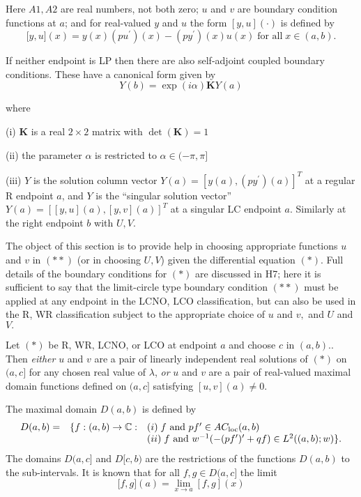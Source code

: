 \documentclass[12pt]{amsart}%
\theoremstyle{plain}
\numberwithin{equation}{section}
\numberwithin{theorem}{section}
\begin{document}
Here $A1,A2$ are real numbers, not both zero; $u$ and $v$ are boundary
condition functions at $a$; and for real-valued $y$ and $u$ the form
$[y,u](\cdot)$ is defined by%
\[
\lbrack y,u](x)=y(x)(pu^{\prime})(x)-(py^{\prime})(x)u(x)\;\text{for
all}\;x\in(a,b).
\]

If neither endpoint is LP then there are also self-adjoint coupled boundary
conditions. These have a canonical form given by%
\[
Y(b)=\exp(i\alpha)\mathbf{K}Y(a)
\]

\noindent where

(i) $\mathbf{K}$ is a real $2\times2$ matrix with $\det(\mathbf{K})=1$

(ii) the parameter $\alpha$ is restricted to $\alpha\in(-\pi,\pi]$

(iii) $Y$ is the solution column vector $Y(a)=[y(a),(py^{\prime})(a)]^{T}$ at
a regular R endpoint $a$, and $Y$ is the ``singular solution vector''
$Y(a)=[[y,u](a),[y,v](a)]^{T}$ at a singular LC endpoint $a$. Similarly at the
right endpoint $b$ with $U,V.$

The object of this section is to provide help in choosing appropriate
functions $u$ and $v$ in $(\ast\ast)$ (or in choosing $U,V$) given the
differential equation $(\ast)$. Full details of the boundary conditions for
$(\ast)$ are discussed in H7; here it is sufficient to say that the
limit-circle type boundary condition $(\ast\ast)$ must be applied at any
endpoint in the LCNO, LCO classification, but can also be used in the R, WR
classification subject to the appropriate choice of $u$ and $v,$ and $U$ and $V.$

Let $(\ast)$ be R, WR, LCNO, or LCO at endpoint $a$ and choose $c$ in
$(a,b).$. Then \textit{either} $u$ and $v$ are a pair of linearly independent
real solutions of $(\ast)$ on $(a,c]$ for any chosen real value of $\lambda$,
\textit{or }$u$ and $v$ are a pair of real-valued maximal domain functions
defined on $(a,c]$ satisfying $[u,v](a)\neq0.$

The maximal domain $D(a,b)$ is defined by%
\[%
\begin{array}
[c]{lll}%
D(a,b)= & \{f:(a,b)\rightarrow\mathbb{C}: & (i)\;f\text{ and }pf^{\prime}\in
AC_{\text{loc}}(a,b)\\
&  & (ii)\;f\text{ and }w^{-1}(-(pf^{\prime})^{\prime}+qf)\in L^{2}%
((a,b);w)\}.
\end{array}
\]
The domains $D(a,c]$ and $D[c,b)$ are the restrictions of the functions
$D(a,b)$ to the sub-intervals. It is known that for all $f,g\in D(a,c]$ the
limit%
\[
\lbrack f,g](a)=\lim_{x\rightarrow a}[f,g](x)
\]
\end{document}
